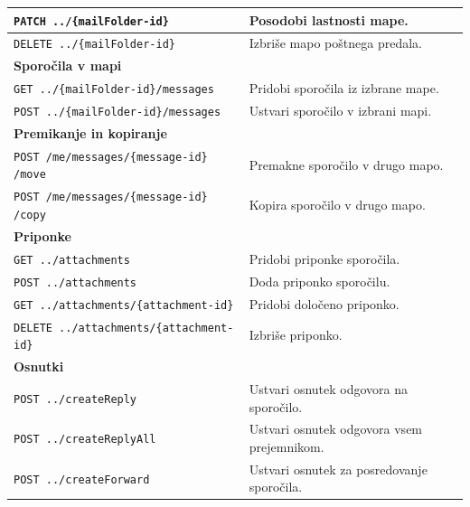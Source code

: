 \documentclass[a4paper, 12pt]{book}
\begin{document}
\begin{longtable}{|p{7cm}|p{7.5cm}|}
\texttt{PATCH ../\{mailFolder-id\}} &
Posodobi lastnosti mape. \\
\hline

\texttt{DELETE ../\{mailFolder-id\}} &
Izbriše mapo poštnega predala. \\
\hline

\multicolumn{2}{|l|}{\textbf{Sporočila v mapi}} \\
\hline

\texttt{GET ../\{mailFolder-id\}/messages} &
Pridobi sporočila iz izbrane mape. \\
\hline

\texttt{POST ../\{mailFolder-id\}/messages} &
Ustvari sporočilo v izbrani mapi. \\
\hline

\multicolumn{2}{|l|}{\textbf{Premikanje in kopiranje}} \\
\hline

\texttt{POST /me/messages/\{message-id\}
/move} &
Premakne sporočilo v drugo mapo. \\
\hline

\texttt{POST /me/messages/\{message-id\}
/copy} &
Kopira sporočilo v drugo mapo. \\
\hline

\multicolumn{2}{|l|}{\textbf{Priponke}} \\
\hline

\texttt{GET ../attachments} &
Pridobi priponke sporočila. \\
\hline

\texttt{POST ../attachments} &
Doda priponko sporočilu. \\
\hline

\texttt{GET ../attachments/\{attachment-id\}} &
Pridobi določeno priponko. \\
\hline

\texttt{DELETE ../attachments/\{attachment-id\}} &
Izbriše priponko. \\
\hline

\multicolumn{2}{|l|}{\textbf{Osnutki}} \\
\hline

\texttt{POST ../createReply} &
Ustvari osnutek odgovora na sporočilo. \\
\hline

\texttt{POST ../createReplyAll} &
Ustvari osnutek odgovora vsem prejemnikom. \\
\hline

\texttt{POST ../createForward} &
Ustvari osnutek za posredovanje sporočila. \\
\hline


\end{longtable}
\end{document}
